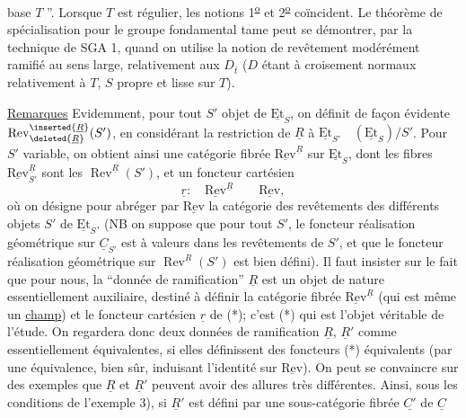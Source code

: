 base $T$ ''. Lorsque $T$ est régulier, les notions 1\textsuperscript{\uline{o}} et 2\textsuperscript{\uline{o}} coïncident. Le théorème de spécialisation pour le groupe fondamental tame peut se démontrer, par la technique de SGA 1, quand on utilise la notion de revêtement modérément ramifié au sens large, relativement aux $D_{\bar{t}}$  ($D$ étant à croisement normaux relativement à $T$, $S$ propre et lisse sur $T$).

\uline{Remarques} Evidemment, pour tout $S'$ objet de $\underline{\mathrm{Et}}_S$, on définit de façon évidente $\operatorname{Rev}_{\deleted{\underline{R}}}^{\inserted{\underline{R}}}(S')$, en considérant la restriction de $\underline{R}$ à $\underline{\mathrm{Et}}_{S'}\quad(\underline{\mathrm{Et}}_S)/S'$. Pour $S'$ variable, on obtient ainsi une catégorie fibrée $\underline{\mathrm{Rev}}^{\underline{R}}$ sur $\underline{\mathrm{Et}}_S$, dont les fibres $\underline{\mathrm{Rev}}_{S'}^{\underline{R}}$ sont les $\operatorname{Rev}^{\underline{R}}(S')$, et un foncteur cartésien
\[
\underline{r}:\quad\underline{\mathrm{Rev}}^{\underline{R}}\qquad\underline{\mathrm{Rev}},
\tag*{(*)}
\]
où on désigne pour abréger par $\underline{\mathrm{Rev}}$ la catégorie  des revêtements des différents objets $S'$ de $\underline{\mathrm{Et}}_S$. (NB on suppose que pour tout $S'$, le foncteur réalisation géométrique sur $\underline{C}_{S'}$ est à valeurs dans les revêtements de $S'$, et que le foncteur réalisation géométrique sur $\operatorname{Rev}^{\underline{R}}(S')$ est bien défini). Il faut insister sur le fait que pour nous, la ``donnée de ramification'' $\underline{R}$ est un objet de nature essentiellement auxiliaire, destiné à définir la catégorie fibrée $\underline{\mathrm{Rev}}^{\underline{R}}$ (qui est même un \uline{champ}) et le foncteur cartésien $\underline{r}$ de (*); c'est (*) qui est l'objet véritable de l'étude. On regardera donc deux données de ramification $\underline{R}$, $\underline{R}'$ comme essentiellement équivalentes, si elles définissent des foncteurs (*) équivalents (par une équivalence, bien sûr, induisant l'identité sur $\underline{\mathrm{Rev}}$). On peut se convaincre sur des exemples que $\underline{R}$ et $\underline{R}'$ peuvent avoir des allures très différentes. Ainsi, sous les conditions de l'exemple 3), si $\underline{R}'$ est défini par une sous-catégorie fibrée  $\underline{C'}$ de $\underline{C}$
